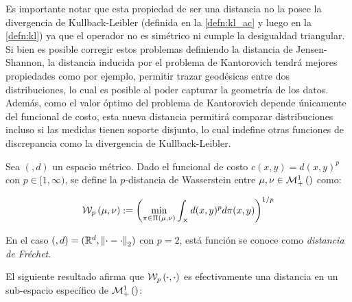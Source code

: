 Es importante notar que esta propiedad de ser una distancia no la posee la divergencia de Kullback-Leibler (definida en la \autoref{defn:kl_ac} y luego en la \autoref{defn:kl}) ya que el operador no es simétrico ni cumple la desigualdad triangular. Si bien es posible corregir estos problemas definiendo la distancia de Jensen-Shannon, la distancia inducida por el problema de Kantorovich tendrá mejores propiedades como por ejemplo, permitir trazar geodésicas entre dos distribuciones, lo cual es posible al poder capturar la geometría de los datos. Además, como el valor óptimo del problema de Kantorovich depende únicamente del funcional de costo, esta nueva distancia permitirá comparar distribuciones incluso si las medidas tienen soporte disjunto, lo cual indefine otras funciones de discrepancia como la divergencia de Kullback-Leibler.

\begin{defn}

	Sea $(\xspace,d)$ un espacio métrico. Dado el funcional de costo $c(x,y)=d(x,y)^p$ con $p\in[1,\infty)$, se define la $p$-distancia de Wasserstein entre $\mu,\nu\in\mathcal{M}_+^1\left(\right)$ como:

	\begin{equation}
		\mathcal{W}_{p}\left(\mu, \nu\right) := \left(\min_{\pi \in \Pi(\mu, \nu)} \int_{\times} d(x, y)^p d\pi(x, y) \right)^{1/p}
	\end{equation}

	En el caso $(,d)=(\mathbb{R}^d,\left\lVert \cdot - \cdot \right\rVert_2)$ con $p=2$, está función se conoce como \textit{distancia de Fréchet}.

\end{defn}

El siguiente resultado afirma que $\mathcal{W}_{p}\left(\cdot,\cdot\right)$ es efectivamente una distancia en un sub-espacio específico de $\mathcal{M}_+^1\left(\right)$:


